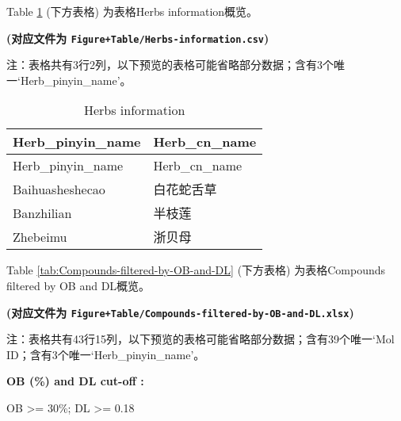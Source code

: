 \documentclass[
]{article}
\begin{document}
Table \ref{tab:Herbs-information} (下方表格) 为表格Herbs information概览。

\textbf{(对应文件为 \texttt{Figure+Table/Herbs-information.csv})}

\begin{center}\begin{tcolorbox}[colback=gray!10, colframe=gray!50, width=0.9\linewidth, arc=1mm, boxrule=0.5pt]注：表格共有3行2列，以下预览的表格可能省略部分数据；含有3个唯一`Herb\_pinyin\_name'。
\end{tcolorbox}
\end{center}

\begin{longtable}[]{@{}ll@{}}
\caption{\label{tab:Herbs-information}Herbs information}\tabularnewline
\toprule
Herb\_pinyin\_name & Herb\_cn\_name\tabularnewline
\midrule
\endfirsthead
\toprule
Herb\_pinyin\_name & Herb\_cn\_name\tabularnewline
\midrule
\endhead
Baihuasheshecao & 白花蛇舌草\tabularnewline
Banzhilian & 半枝莲\tabularnewline
Zhebeimu & 浙贝母\tabularnewline
\bottomrule
\end{longtable}

Table \ref{tab:Compounds-filtered-by-OB-and-DL} (下方表格) 为表格Compounds filtered by OB and DL概览。

\textbf{(对应文件为 \texttt{Figure+Table/Compounds-filtered-by-OB-and-DL.xlsx})}

\begin{center}\begin{tcolorbox}[colback=gray!10, colframe=gray!50, width=0.9\linewidth, arc=1mm, boxrule=0.5pt]注：表格共有43行15列，以下预览的表格可能省略部分数据；含有39个唯一`Mol ID；含有3个唯一`Herb\_pinyin\_name'。
\end{tcolorbox}
\end{center}\begin{center}\begin{tcolorbox}[colback=gray!10, colframe=gray!50, width=0.9\linewidth, arc=1mm, boxrule=0.5pt]
\textbf{
OB (\%) and DL cut-off
:}

\vspace{0.5em}

    OB >= 30\%; DL >= 0.18

\vspace{2em}
\end{tcolorbox}
\end{center}
\end{document}

